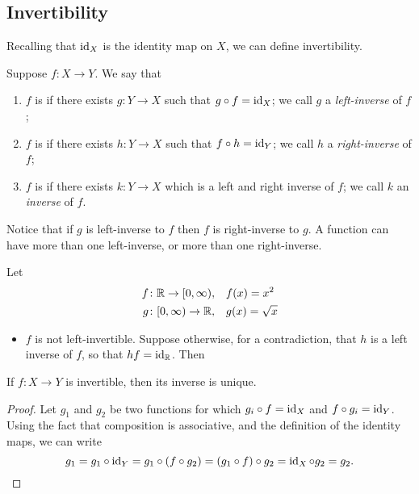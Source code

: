 \subsection{Invertibility}
Recalling that $\operatorname{id}_X$ is the identity map on $X$, we can define invertibility.

\begin{definition}[Invertibility]
Suppose $f\colon X\to Y$. We say that
\begin{enumerate}[label=(\roman*)]
\item $f$ is  if there exists $g\colon Y\to X$ such that $g\circ f=\operatorname{id}_X$; we call $g$ a \emph{left-inverse} of $f$;
\item $f$ is  if there exists $h\colon Y\to X$ such that $f\circ h=\operatorname{id}_Y$; we call $h$ a \emph{right-inverse} of $f$;
\item $f$ is  if there exists $k\colon Y\to X$ which is a left and right inverse of $f$; we call $k$ an \emph{inverse} of $f$.
\end{enumerate}
\end{definition}

\begin{remark}
Notice that if $g$ is left-inverse to $f$ then $f$ is right-inverse to $g$. A function can have more than one left-inverse, or more than one right-inverse.
\end{remark}

\begin{example}
Let
\begin{align*}
f\colon \mathbb R\to[0,\infty),&\quad f(x)=x^2\\
g\colon [0,\infty)\to\mathbb R,&\quad g(x)=\sqrt{x}
\end{align*}
\begin{itemize}
\item $f$ is not left-invertible. Suppose otherwise, for a contradiction, that $h$ is a left inverse of $f$, so that $hf=\operatorname{id}_\mathbb R$. Then 
\end{itemize}
\end{example}

\begin{lemma}
If $f\colon X\to Y$ is invertible, then its inverse is unique.
\end{lemma}

\begin{proof}
Let $g_1$ and $g_2$ be two functions for which $g_i\circ f=\operatorname{id}_X$ and $f\circ g_i=\operatorname{id}_Y$. Using the fact that composition is associative, and the definition of the identity maps, we can write
\[ g_1 = g_1 \circ \operatorname{id}_Y = g_1 \circ (f \circ g_2) = (g_1 \circ f) \circ g_2 = \operatorname{id}_X \circ g_2 = g_2.\]
\end{proof}

